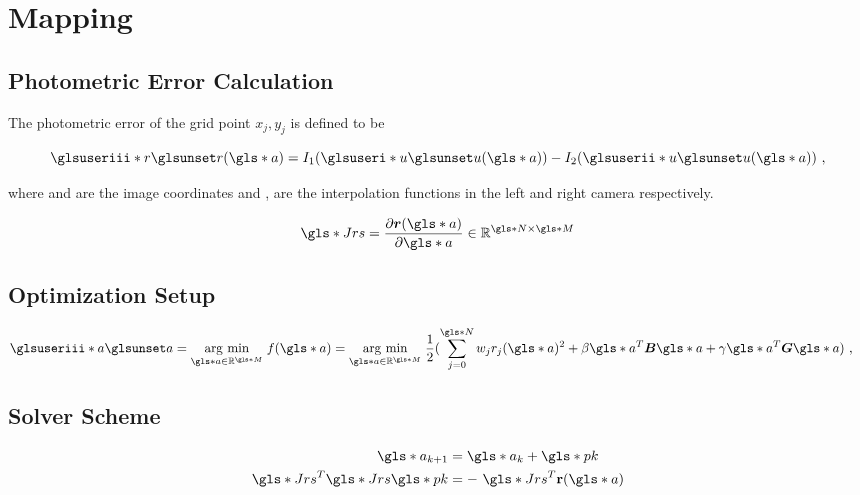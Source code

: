 \section{Mapping}

\subsection{Photometric Error Calculation}
\label{sec:methods-mapping-photometric}

The photometric error of the grid point ${x_j}, {y_j}$ is defined to be

\begin{equation*}
  \giii{r} (\g{a}) = I_1(\gi{u}(\g{a})) - I_2(\gii{u}(\g{a})) \text{ ,}
  \label{eq:photometric}
\end{equation*}

where  and  are the image coordinates and ,  are the
interpolation functions in the left and right camera respectively.

\begin{equation*}
  \g{Jrs} = \frac{\partial \vc r(\g{a})}{\partial\g{a}}
  \inR{\g{N}\times\g{M}}
\end{equation*}

\subsection{Optimization Setup}
\label{sec:methods-mapping-optimization}

\begin{align*}
    \giii{a} &= \argmin{\g{a}\inR{\g{M}}} f(\g{a}) 
    = \argmin{\g{a}\inR{\g{M}}} \frac{1}{2} (\sum_{j = 0}^{\g{N}} 
    w_j r_j(\g{a})^2
    + \beta \g{a}^T \vc B \g{a}
    + \gamma \g{a}^T \vc G \g{a}) \text{ ,}
\end{align*}

\subsection{Solver Scheme}
\label{sec:methods-mapping-scheme}

\begin{align*}
  \g{a}_{k+1} &= \g{a}_k + \g{pk}\\
  \g{Jrs}^T \g{Jrs} \g{pk} &= - \g{Jrs} ^T \mathbf r(\g{a})
\end{align*}
